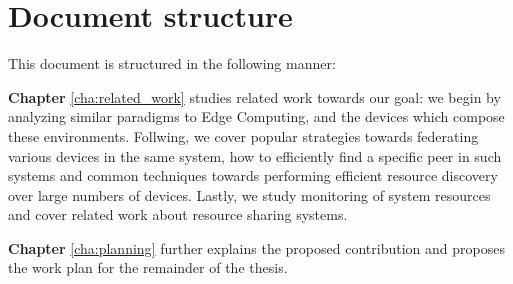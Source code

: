 \section{Document structure}

This document is structured in the following manner:

\textbf{Chapter} \ref{cha:related_work} studies related work towards our goal: we begin by analyzing similar paradigms to Edge Computing, and the devices which compose these environments. Follwing, we cover popular strategies towards federating various devices in the same system, how to efficiently find a specific peer in such systems and common techniques towards performing efficient resource discovery over large numbers of devices. Lastly, we study monitoring of system resources and cover related work about resource sharing systems.

\textbf{Chapter} \ref{cha:planning} further explains the proposed contribution and proposes the work plan for the remainder of the thesis. 

